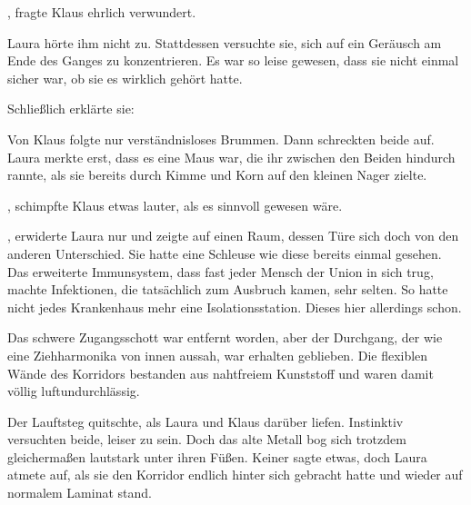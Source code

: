 \par

, fragte Klaus ehrlich verwundert.

\par

Laura hörte ihm nicht zu. Stattdessen versuchte sie, sich auf ein Geräusch am Ende des Ganges zu konzentrieren. Es war so leise gewesen, dass sie nicht einmal sicher war, ob sie es wirklich gehört hatte.

\par

Schließlich erklärte sie: 

\par

Von Klaus folgte nur verständnisloses Brummen. Dann schreckten beide auf. Laura merkte erst, dass es eine Maus war, die ihr zwischen den Beiden hindurch rannte, als sie bereits durch Kimme und Korn auf den kleinen Nager zielte.

\par

, schimpfte Klaus etwas lauter, als es sinnvoll gewesen wäre.

\par

, erwiderte Laura nur und zeigte auf einen Raum, dessen Türe sich doch von den anderen Unterschied. Sie hatte eine Schleuse wie diese bereits einmal gesehen. Das erweiterte Immunsystem, dass fast jeder Mensch der Union in sich trug, machte Infektionen, die tatsächlich zum Ausbruch kamen, sehr selten. So hatte nicht jedes Krankenhaus mehr eine Isolationsstation. Dieses hier allerdings schon.

\par

Das schwere Zugangsschott war entfernt worden, aber der Durchgang, der wie eine Ziehharmonika von innen aussah, war erhalten geblieben. Die flexiblen Wände des Korridors bestanden aus nahtfreiem Kunststoff und waren damit völlig luftundurchlässig.

\par

Der Lauftsteg quitschte, als Laura und Klaus darüber liefen. Instinktiv versuchten beide, leiser zu sein. Doch das alte Metall bog sich trotzdem gleichermaßen lautstark unter ihren Füßen. Keiner sagte etwas, doch Laura atmete auf, als sie den Korridor endlich hinter sich gebracht hatte und wieder auf normalem Laminat stand.

